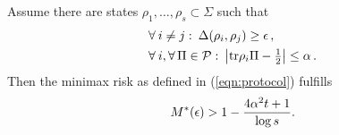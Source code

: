 \begin{lemma}\label{minimaxlemma}
	Assume there are states $\rho_1, \dots, \rho_s\subset\Sigma$ such
	that 
	\begin{align*}
		&\forall\>i\neq j: \> \Delta(\rho_i, \rho_j) \geq \epsilon \,,\\
		&\forall\>i,\forall\, \Pi \in \mathcal{P}:\> \bigl|\mathrm{tr} \rho_i \Pi - \tfrac12\bigr| \leq \alpha \,.
	\end{align*}
	Then the minimax risk as defined in (\ref{eqn:protocol}) fulfills
	\begin{align*}
		M^*(\epsilon)>1-\frac{4\alpha^2 t + 1}{\log s}.
	\end{align*}
\end{lemma}

